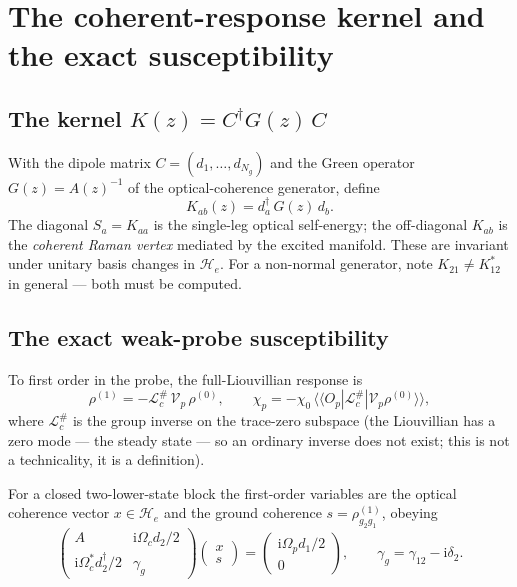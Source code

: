 \documentclass[11pt,a4paper]{article}
\theoremstyle{remark}
\newcommand{\He}{\mathcal{H}_e}
\newcommand{\im}{\mathrm{i}}
\newcommand{\kett}[1]{|#1\rangle\!\rangle}
\newcommand{\braa}[1]{\langle\!\langle #1|}
\begin{document}
\section{The coherent-response kernel and the exact susceptibility}

\subsection{The kernel $K(z)=C^\dagger G(z)\,C$}

With the dipole matrix $C=(d_1,\dots,d_{N_g})$ and the Green operator
$G(z)=A(z)^{-1}$ of the optical-coherence generator, define
\begin{equation}
K_{ab}(z)=d_a^\dagger\,G(z)\,d_b .
\end{equation}
The diagonal $S_a=K_{aa}$ is the single-leg optical self-energy; the
off-diagonal $K_{ab}$ is the \emph{coherent Raman vertex} mediated by the
excited manifold. These are invariant under unitary basis changes in $\He$.
For a non-normal generator, note $K_{21}\neq K_{12}^*$ in general --- both
must be computed.

\subsection{The exact weak-probe susceptibility}

To first order in the probe, the full-Liouvillian response is
\begin{equation}
\rho^{(1)}=-\mathcal{L}_c^{\#}\,\mathcal{V}_p\,\rho^{(0)},
\qquad
\chi_p=-\chi_0\,\braa{O_p}\mathcal{L}_c^{\#}\kett{\mathcal{V}_p\rho^{(0)}},
\label{eq:fullresp}
\end{equation}
where $\mathcal{L}_c^{\#}$ is the group inverse on the trace-zero subspace
(the Liouvillian has a zero mode --- the steady state --- so an ordinary
inverse does not exist; this is not a technicality, it is a definition).

For a closed two-lower-state block the first-order variables are the optical
coherence vector $x\in\He$ and the ground coherence
$s=\rho^{(1)}_{g_2g_1}$, obeying
\begin{equation}
\begin{pmatrix}
A & \im\Omega_c d_2/2\\
\im\Omega_c^* d_2^\dagger/2 & \gamma_g
\end{pmatrix}
\begin{pmatrix} x\\ s\end{pmatrix}
=
\begin{pmatrix} \im\Omega_p d_1/2\\ 0\end{pmatrix},
\qquad
\gamma_g=\gamma_{12}-\im\delta_2 .
\label{eq:block}
\end{equation}
\end{document}

